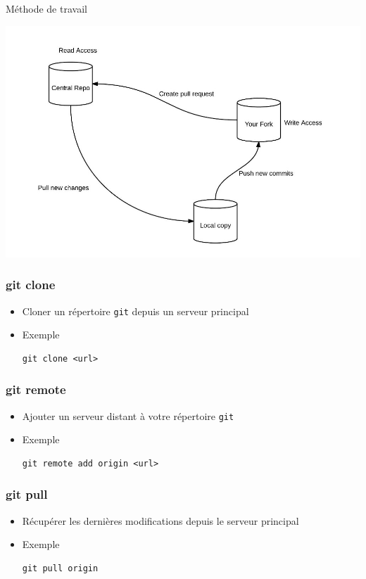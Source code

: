 \documentclass{beamer}
\begin{document}
\begin{frame}{Méthode de travail}
    \begin{center}
        \includegraphics[width=\textwidth]{img/github-workflow.jpg}
    \end{center}
\end{frame}

\begin{frame}[fragile]
\frametitle{git clone}

\begin{itemize}
\item Cloner un répertoire \texttt{git} depuis un serveur principal
\item Exemple
\begin{lstlisting}
git clone <url>
\end{lstlisting}
\end{itemize}
\end{frame}

\begin{frame}[fragile]
\frametitle{git remote}

\begin{itemize}
\item Ajouter un serveur distant à votre répertoire \texttt{git}
\item Exemple
\begin{lstlisting}
git remote add origin <url>
\end{lstlisting}
\end{itemize}
\end{frame}


\begin{frame}[fragile]
\frametitle{git pull}

\begin{itemize}
\item Récupérer les dernières modifications depuis le serveur principal
\item Exemple
\begin{lstlisting}
git pull origin
\end{lstlisting}
\end{itemize}
\end{frame}
\end{document}

